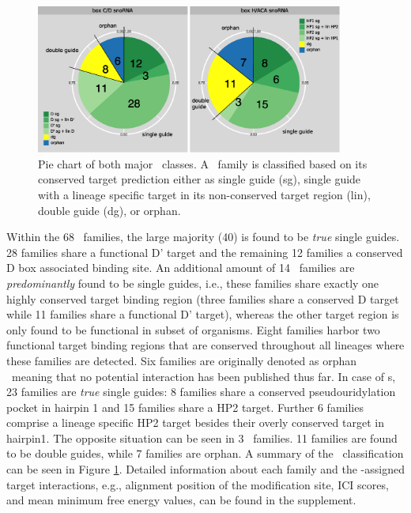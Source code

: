 \begin{figure}
  \centering
  \includegraphics[width=0.9\textwidth]{pics/pieCharts_snoRNAs_modified.eps}
  \caption[Classification of \sno\ families as single or double guides.]{Pie
    chart of both major \sno\ classes. A \sno\ family is classified based on
    its conserved target prediction either as single guide (sg), single
    guide with a lineage specific target in its non-conserved target
    region (lin),
    double guide (dg), or orphan.}
  \label{fig:pie_charts}
\end{figure}

Within the 68 \cd\ families, the large majority (40) is found to be
\textit{true} single guides. 28 families share a functional D' target
and the remaining 12 families a conserved D box associated binding
site. An additional amount of 14 \cd\ families are \textit{predominantly}
found to be single guides, i.e., these families share exactly one highly
conserved target binding region (three families share a conserved D target
while 11 families share a functional D' target), whereas the other
target region is only found to be functional in subset of
organisms. Eight families harbor two
functional target binding regions that are conserved throughout all
lineages where these families are detected. 
Six families
 are originally denoted as orphan \sno\ meaning that no potential interaction has been
 published thus far. In case of \haca s, 23 families are \textit{true}
 single guides: 8 families share a conserved pseudouridylation pocket
 in hairpin 1 and 15 families share a HP2 target. Further 6 families
 comprise a lineage specific HP2 target besides their overly
 conserved target in hairpin1. The opposite situation can be seen in 3
 \haca\ families. 11 families are found to be double guides, while 7
 families are orphan. A summary of the \sno\ classification can be seen
 in Figure \ref{fig:pie_charts}.  Detailed information about each family and the
 \snostrip-assigned target interactions, e.g., alignment position of
 the modification site, ICI scores, and mean minimum free energy
 values, can be found in the supplement. 


